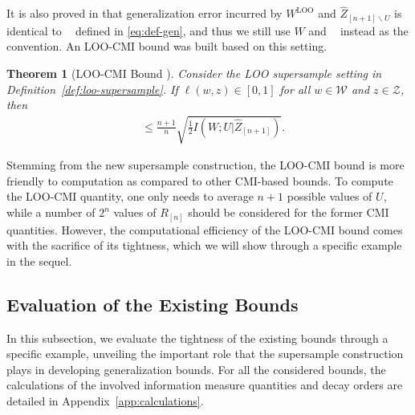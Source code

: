 \documentclass[onecolumn,romanappendices,10pt]{IEEEtran}
\newtheorem{theorem}{Theorem}
\newcommand{\Wcal}{{\mathcal W}}
\newcommand{\Zcal}{{\mathcal Z}}
\DeclareMathOperator{\gen}{\overline{gen}}
\begin{document}
	It is also proved in \cite[Lemma~7.2]{rammal2022leave} that generalization error incurred by $W^{\textrm{LOO}}$ and $\hat{Z}_{[n+1] \backslash U}$ is identical to $\gen$ defined in \eqref{eq:def-gen}, and thus we still use $W$ and $\gen$ instead as the convention. An LOO-CMI bound was built based on this setting.
	\begin{theorem}[LOO-CMI Bound \cite{haghifam2022understanding,rammal2022leave}] \label{thm:LOO-CMI}
		Consider the LOO supersample setting in Definition~\ref{def:loo-supersample}. If $\ell(w, z) \in [0, 1]$ for all $w \in \Wcal$ and $z \in \Zcal$, then
		\begin{align}
			\gen &\leq \frac{n+1}{n} \sqrt{\frac{1}{2} I\left( W; U | \hat{Z}_{[n+1]} \right)}.
			\label{eq:LOO-CMI}
		\end{align}
	\end{theorem}
	
	Stemming from the new supersample construction, the LOO-CMI bound is more friendly to computation as compared to other CMI-based bounds. To compute the LOO-CMI quantity, one only needs to average $n+1$ possible values of $U$, while a number of $2^n$ values of $R_{[n]}$ should be considered for the former CMI quantities. However, the computational efficiency of the LOO-CMI bound comes with the sacrifice of its tightness, which we will show through a specific example in the sequel.
	
	
	\subsection{Evaluation of the Existing Bounds}
	In this subsection, we evaluate the tightness of the existing bounds through a specific example, unveiling the important role that the supersample construction plays in developing generalization bounds. For all the considered bounds, the calculations of the involved information measure quantities and decay orders are detailed in Appendix~\ref{app:calculations}.
	
\end{document}
